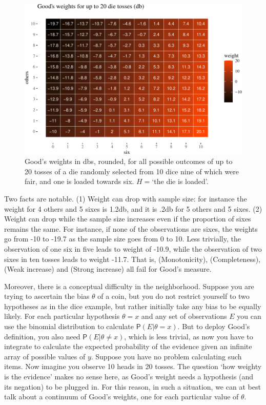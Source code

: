 \documentclass[
  10pt,
  dvipsnames,enabledeprecatedfontcommands]{scrartcl}
\newcommand{\pr}[1]{\mathsf{P}(#1)}
\begin{document}
\begin{figure}

\begin{center}\includegraphics[width=1\linewidth]{imprecision_weight_files/figure-latex/goodWEights-1} \end{center}
\caption{Good's weights in dbs, rounded, for all possible outcomes of up to 20 tosses of a die randomly selected from 10 dice nine of which were fair, and one is  loaded towards six. $H=$`the die is loaded'.}
\label{fig:goodWeight}
\end{figure}

Two facts are notable. (1) Weight can drop with sample size: for
instance the weight for 4 others and 5 sixes is 1.2db, and it is .2db
for 5 others and 5 sixes. (2) Weight can drop while the sample size
increases even if the proportion of sixes remains the same. For
instance, if none of the observations are sixes, the weights go from -10
to -19.7 as the sample size goes from 0 to 10. Less trivially, the
observation of one six in five leads to weight of -10.9, while the
observation of two sixes in ten tosses leads to weight -11.7. That is,
(Monotonicity), (Completeness), (Weak increase) and (Strong increase)
all fail for Good's measure.

Moreover, there is a conceptual difficulty in the neighborhood. Suppose
you are trying to ascertain the bias \(\theta\) of a coin, but you do
not restrict yourself to two hypotheses as in the dice example, but
rather initially take any bias to be equally likely. For each particular
hypothesis \(\theta = x\) and any set of observations \(E\) you can use
the binomial distribution to calculate \(\pr{E \vert \theta = x}\). But
to deploy Good's definition, you also need
\(\pr{E \vert \theta \neq x}\), which is less trivial, as now you have
to integrate to calculate the expected probability of the evidence given
an infinite array of possible values of \(y\). Suppose you have no
problem calculating such items. Now imagine you observe 10 heads in 20
tosses. The question `how weighty is the evidence' makes no sense here,
as Good's weight needs a hypothesis (and its negation) to be plugged in.
For this reason, in such a situation, we can at best talk about a
continuum of Good's weights, one for each particular value of
\(\theta\).
\end{document}

